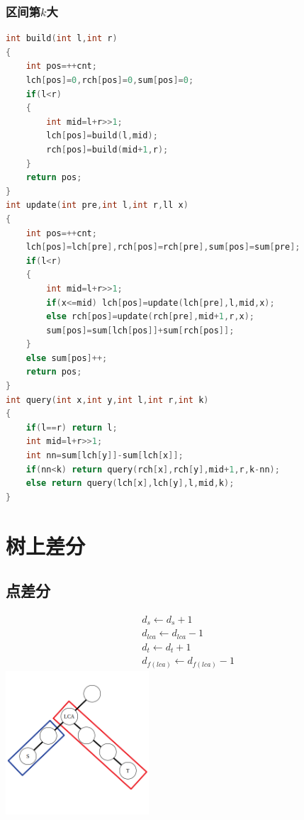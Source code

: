 \documentclass[a4paper]{book}
\begin{document}
\subsubsection{区间第$k$大}
\begin{lstlisting}[language=c++]
int build(int l,int r)
{
    int pos=++cnt;
    lch[pos]=0,rch[pos]=0,sum[pos]=0;
    if(l<r)
    {
        int mid=l+r>>1;
        lch[pos]=build(l,mid);
        rch[pos]=build(mid+1,r);
    }
    return pos;
}
int update(int pre,int l,int r,ll x)
{
    int pos=++cnt;
    lch[pos]=lch[pre],rch[pos]=rch[pre],sum[pos]=sum[pre];
    if(l<r)
    {
        int mid=l+r>>1;
        if(x<=mid) lch[pos]=update(lch[pre],l,mid,x);
        else rch[pos]=update(rch[pre],mid+1,r,x);
        sum[pos]=sum[lch[pos]]+sum[rch[pos]];
    }
    else sum[pos]++;
    return pos;
}
int query(int x,int y,int l,int r,int k)
{
    if(l==r) return l;
    int mid=l+r>>1;
    int nn=sum[lch[y]]-sum[lch[x]];
    if(nn<k) return query(rch[x],rch[y],mid+1,r,k-nn);
    else return query(lch[x],lch[y],l,mid,k);
}
\end{lstlisting}
\section{树上差分}
\subsection{点差分}
$$
\begin{aligned}
    &d_s \leftarrow d_s+1\\
    &d_{lca} \leftarrow d_{lca}-1\\
    &d_t \leftarrow d_t+1 \\
    &d_{f(lca)} \leftarrow d_{f(lca)}-1
\end{aligned}
$$
\includegraphics[width=0.4\textwidth,center]{../photo/prefix_sum1.png}
\end{document}
